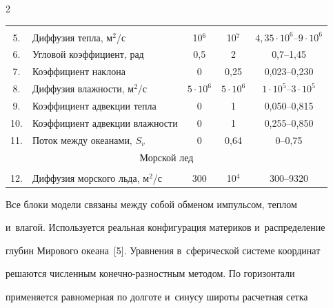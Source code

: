 \begin{multicols}{2}
\begin{table}[b]
\begin{center}
\begin{tabular}{|c|l|c|c|c|}
\hline


&&&&\\[-9pt]


5. & Диффузия тепла, м$^2$/с & 10$^6$ & 10$^7$ & $4{,}35\cdot 10^6$--$9\cdot 10^6$\\


6. & Угловой коэффициент, рад & 0,5& 2& 0,7--1,45\\


7. & Коэффициент наклона & 0& 0,25& 0,023--0,230\\


8. & Диффузия влажности, м$^2$/с & $5\cdot 10^6$ & $5\cdot 10^6$ & $1\cdot 10^5$--$3\cdot 10^5$\\


9. & Коэффициент адвекции тепла & 0 & 1& 0,050--0,815\\


10.\hphantom{9} & Коэффициент адвекции влажности & 0 &1& 0,255--0,850\\


11.\hphantom{9} & Поток между океанами, $S_v$ & 0 & 0,64& 0--0,75\\


\hline


\multicolumn{5}{|c|}{Морской лед}\\


\hline


&&&&\\[-9pt]


12.\hphantom{9} &Диффузия морского льда, м$^2$/с & 300& 10$^4$ & 300--9320\\


\hline


\end{tabular}


\end{center}


\end{table}


  


  Все блоки модели связаны между собой обменом импульсом, теплом 


и~влагой. Используется реальная конфигурация материков и~распределение 


глубин Мирового океана~[5]. Уравнения в~сферической системе координат 


решаются численным ко\-неч\-но-раз\-ност\-ным методом. По горизонтали 


применяется равномерная по долготе и~синусу широты расчетная сетка 



\end{multicols}
